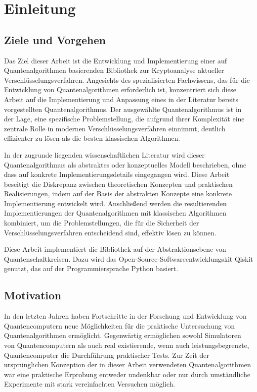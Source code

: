 \section{Einleitung}

\subsection{Ziele und Vorgehen}
Das Ziel dieser Arbeit ist die Entwicklung und Implementierung einer auf Quantenalgorithmen 
basierenden Bibliothek zur Kryptoanalyse aktueller Verschlüsselungsverfahren. 
Angesichts des spezialisierten Fachwissens, das für die Entwicklung von Quantenalgorithmen erforderlich ist, 
konzentriert sich diese Arbeit auf die Implementierung und Anpassung eines in der Literatur bereits vorgestellten Quantenalgorithmus.
Der ausgewählte Quantenalgorithmus ist in der Lage, eine spezifische Problemstellung, 
die aufgrund ihrer Komplexität eine zentrale Rolle in modernen Verschlüsselungsverfahren einnimmt, 
deutlich effizienter zu lösen als die besten klassischen Algorithmen.

In der zugrunde liegenden wissenschaftlichen Literatur wird dieser Quantenalgorithmus als abstraktes oder konzeptuelles Modell beschrieben, 
ohne dass auf konkrete Implementierungsdetails eingegangen wird. 
Diese Arbeit beseitigt die Diskrepanz zwischen theoretischen Konzepten und praktischen Realisierungen, 
indem auf der Basis der abstrakten Konzepte eine konkrete Implementierung entwickelt wird.
Anschließend werden die resultierenden Implementierungen der Quantenalgorithmen mit klassischen Algorithmen kombiniert, 
um die Problemstellungen, die für die Sicherheit der Verschlüsselungsverfahren entscheidend sind, effektiv lösen zu können. 

Diese Arbeit implementiert die Bibliothek auf der Abstraktionsebene von Quantenschaltkreisen.
Dazu wird das Open-Source-Softwareentwicklungskit Qiskit genutzt, das auf der Programmiersprache Python basiert.

\subsection{Motivation}
In den letzten Jahren haben Fortschritte in der Forschung und Entwicklung von Quantencomputern neue Möglichkeiten für die praktische Untersuchung von Quantenalgorithmen ermöglicht.
Gegenwärtig ermöglichen sowohl Simulatoren von Quantencomputern als auch real existierende, wenn auch leistungsbegrenzte, Quantencomputer die Durchführung praktischer Tests.
Zur Zeit der ursprünglichen Konzeption der in dieser Arbeit verwendeten Quantenalgorithmen war eine praktische Erprobung entweder undenkbar oder nur durch umständliche Experimente mit stark vereinfachten Versuchen möglich.

